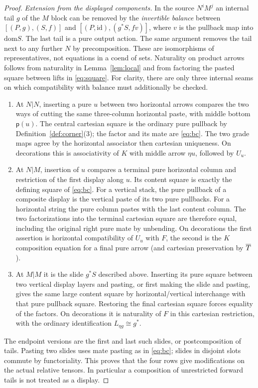 \documentclass[11pt]{article}
\theoremstyle{definition}\newtheorem{definition}[theorem]{Definition}
\newcommand{\id}{\mathrm{id}}\newcommand{\op}{\mathrm{op}}\newcommand{\dom}{\mathrm{dom}}
\newcommand{\pure}{\mathsf{p}}\newcommand{\grade}{\mathsf G}
\begin{document}
\begin{proof}
\emph{Extension from the displayed components.}
In the source $N^iM^j$ an internal tail $g$ of the $M$ block
can be removed by the \emph{invertible balance} between
$[(P,g),(S,f)]$ and $[(P,\id),(g^*S,fv)]$, where $v$ is the
pullback map into $\dom S$. The last tail is a pure output action.
The same argument removes the tail next to any further $N$ by
precomposition. These are isomorphisms of representatives, not
equations in a coend of sets. Naturality on product arrows follows
from naturality in Lemma~\ref{lem:local} and from factoring the
pasted square between lifts in \eqref{eq:square}.
For clarity, there are only three internal seams on which compatibility
with balance must additionally be checked.
\begin{enumerate}
\item At $N|N$, inserting a pure $u$ between two horizontal arrows
compares the two ways of cutting the same three-column horizontal
paste, with middle bottom $\pure(u)$. The central cartesian square
is the ordinary pure pullback by Definition~\ref{def:corner}(3);
the factor and its mate are \eqref{eq:bc}. The two grade maps
agree by the horizontal associator then cartesian uniqueness.
On decorations this is associativity of $K$ with middle arrow
$\eta u$, followed by $U_u$.
\item At $N|M$, insertion of $u$ compares a terminal pure horizontal
column and restriction of the first display along $u$. Its content
square is exactly the defining square of \eqref{eq:bc}.
For a vertical stack, the pure pullback of a composite display is
the vertical paste of its two pure pullbacks. For a horizontal
string the pure column pastes with the last content column.
The two factorizations into the terminal cartesian square are
therefore equal, including the original right pure mate by unbending.
On decorations the first assertion is horizontal compatibility of
$U_u$ with $F$, the second is the $K$ composition equation for a
final pure arrow (and cartesian preservation by $\overline T$).
\item At $M|M$ it is the slide $g^*S$ described above. Inserting
its pure square between two vertical display layers and pasting, or
first making the slide and pasting, gives the same large content
square by horizontal/vertical interchange with that pure pullback
square. Restoring the final cartesian square forces equality of the
factors. On decorations it is naturality of $F$ in this cartesian
restriction, with the ordinary identification $L_{\eta g}\cong g^*$.
\end{enumerate}
The endpoint versions are the first and last such slides, or postcomposition
of tails. Pasting two slides uses mate pasting as in \eqref{eq:bc};
slides in disjoint slots commute by functoriality. This proves that
the four rows give modifications on the actual relative tensors.
In particular a composition of unrestricted forward tails is not
treated as a display.


\end{proof}
\end{document}
